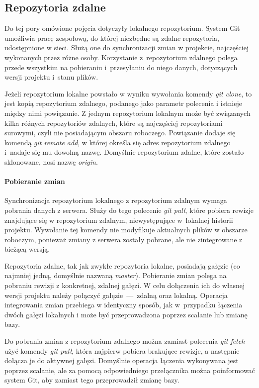 \documentclass[11pt,a4paper,polish,thesis]{dcsbook}
\begin{document}
	\subsection{Repozytoria zdalne}
	Do tej pory omówione pojęcia dotyczyły lokalnego repozytorium. System Git umożliwia pracę zespołową, do której niezbędne są zdalne repozytoria, udostępnione w sieci. Służą one do synchronizacji zmian w projekcie, najczęściej wykonanych przez różne osoby. Korzystanie z~repozytorium zdalnego polega przede wszystkim na pobieraniu i~przesyłaniu do niego danych, dotyczących wersji projektu i~stanu plików.

	Jeżeli repozytorium lokalne powstało w wyniku wywołania komendy \textit{git clone}, to jest kopią repozytorium zdalnego, podanego jako parametr polecenia i istnieje między nimi powiązanie.
	Z jednym repozytorium lokalnym może być związanych kilka różnych repozytoriów zdalnych, które są najczęściej repozytoriami surowymi, czyli nie posiadającym obszaru roboczego. Powiązanie dodaje się komendą \textit{git remote add}, w której określa się adres repozytorium zdalnego i~nadaje się mu dowolną nazwę. Domyślnie repozytorium zdalne, które zostało sklonowane, nosi nazwę \textit{origin}.

	\paragraph{Pobieranie zmian}
	Synchronizacja repozytorium lokalnego z repozytorium zdalnym wymaga pobrania danych z serwera. Służy do tego polecenie \textit{git pull}, które pobiera rewizje znajdujące się w repozytorium zdalnym, niewystępujące w~lokalnej historii projektu. Wywołanie tej komendy nie modyfikuje aktualnych plików w obszarze roboczym, ponieważ zmiany z serwera zostały pobrane, ale nie zintegrowane z bieżącą wersją.

	Repozytoria zdalne, tak jak zwykłe repozytoria lokalne, posiadają gałęzie (co najmniej jedną, domyślnie nazwaną \textit{master}). Pobieranie zmian polega na pobraniu rewizji z konkretnej, zdalnej gałęzi. W celu dołączenia ich do własnej wersji projektu należy połączyć gałęzie~---~zdalną oraz lokalną. Operacja integrowania zmian przebiega w identyczny sposób, jak w~przypadku łączenia dwóch gałęzi lokalnych i może być przeprowadzona poprzez scalanie lub zmianę bazy.

	Do pobrania zmian z repozytorium zdalnego można zamiast polecenia \textit{git fetch} użyć komendy \textit{git pull}, która najpierw pobiera brakujące rewizje, a następnie dołącza je do aktywnej gałęzi. Domyślnie operacja łączenia wykonywana jest poprzez scalanie, ale za pomocą odpowiedniego przełącznika można poinformować system Git, aby zamiast tego przeprowadził zmianę bazy. 
\end{document}
